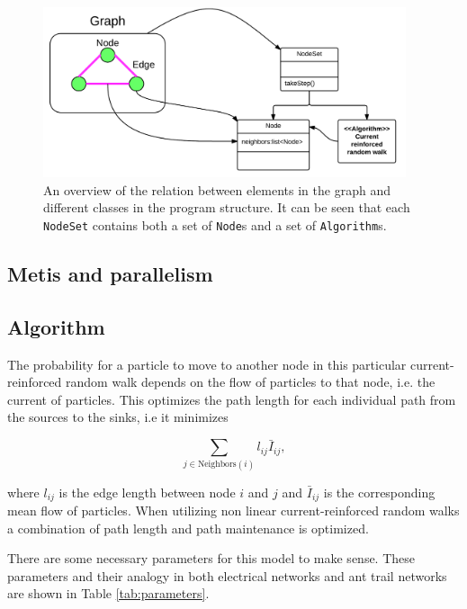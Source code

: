 \begin{figure}[H]
\centering
\includegraphics[width=0.95\textwidth]{img/graphToClass.png}
\caption{An overview of the relation between elements in the graph and different classes in the program structure. It can be seen that each \texttt{NodeSet} contains both a set of \texttt{Node}s and a set of \texttt{Algorithm}s.}
\label{fig:graphToClass}
\end{figure}

\subsection{Metis and parallelism}

\subsection{Algorithm}
\label{sec:appendix:algorithm}
The probability for a particle to move to another node in this particular current-reinforced random walk depends on the flow of particles to that node, i.e. the current of particles. This optimizes the path length for each individual path from the sources to the sinks, i.e it minimizes 

\begin{equation}
\sum_{j \in \text{Neighbors}(i)} l_{ij} \bar{I}_{ij},
\end{equation}

\noindent where $l_{ij}$ is the edge length between node $i$ and $j$ and $\bar{I}_{ij}$ is the corresponding mean flow of particles. When utilizing non linear current-reinforced random walks a combination of path length and path maintenance is optimized. 

There are some necessary parameters for this model to make sense. These parameters and their analogy in both electrical networks and ant trail networks are shown in Table \ref{tab:parameters}.


